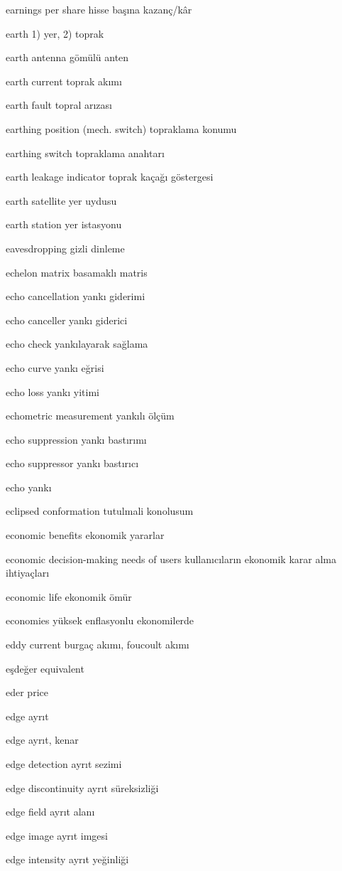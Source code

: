 \documentclass[12pt,fleqn]{article}\usepackage{../../common}
\begin{document}
earnings per share hisse başına kazanç/kâr

earth 1) yer, 2) toprak

earth antenna gömülü anten

earth current toprak akımı

earth fault topral arızası

earthing position (mech. switch) topraklama konumu

earthing switch topraklama anahtarı

earth leakage indicator toprak kaçağı göstergesi

earth satellite yer uydusu

earth station yer istasyonu

eavesdropping gizli dinleme

echelon matrix basamaklı matris

echo cancellation yankı giderimi

echo canceller yankı giderici

echo check yankılayarak sağlama

echo curve yankı eğrisi

echo loss yankı yitimi

echometric measurement yankılı ölçüm

echo suppression yankı bastırımı

echo suppressor yankı bastırıcı

echo yankı

eclipsed conformation tutulmali konolusum

economic benefits ekonomik yararlar

economic decision-making needs of users kullanıcıların ekonomik karar alma ihtiyaçları

economic life ekonomik ömür

economies yüksek enflasyonlu ekonomilerde

eddy current burgaç akımı, foucoult akımı

eşdeğer equivalent

eder price

edge ayrıt

edge ayrıt, kenar

edge detection ayrıt sezimi

edge discontinuity ayrıt süreksizliği

edge field ayrıt alanı

edge image ayrıt imgesi

edge intensity ayrıt yeğinliği
\end{document}
